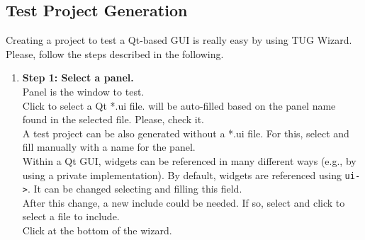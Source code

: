 
\subsection{Test Project Generation}

Creating a project to test a Qt-based GUI is really easy by using TUG
Wizard. Please, follow the steps described in the following.

\begin{enumerate}
%
\item {\bf Step 1: Select a panel.}\\
%
  Panel is the window to test. \\Click {} to select a Qt
  *.ui file.   will be auto-filled based on the
  panel name found in the selected file. Please, check it.\\
%
  A test project can be also generated without a *.ui file. For this,
  select  and fill 
  manually with a name for the panel.\\
%
  Within a Qt GUI, widgets can be referenced in many different ways (e.g.,
  by using a private implementation). By default, widgets are referenced
  using {\tt ui->}. It can be changed selecting  and
  filling this field.\\
%
  After this change, a new include could be needed. If so, select
   and click  to select a file to
  include.\\
%
  Click  at the bottom of the wizard.


\end{enumerate}
